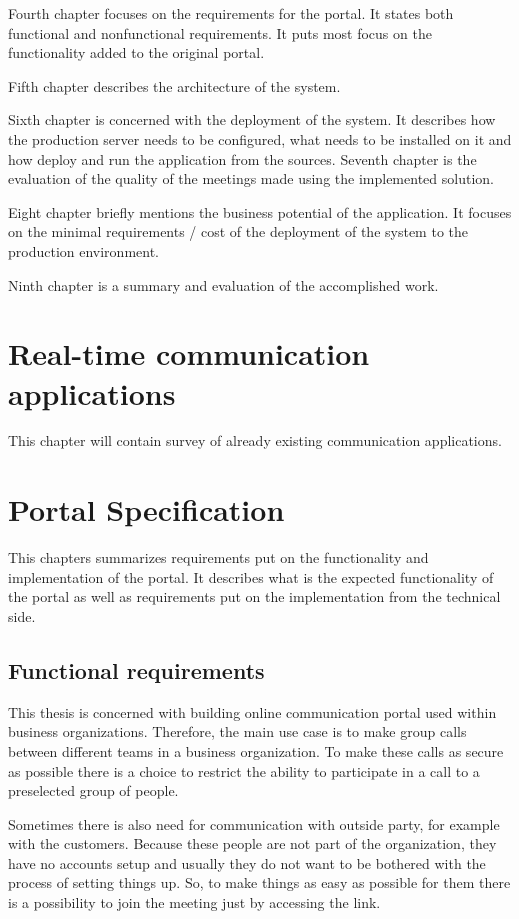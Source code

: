 \documentclass[
  digital, %
  table,   %
  lof,     %
  nolot,     %
]{fithesis3}
\begin{document}
Fourth chapter focuses on the requirements for the portal. It states both functional and nonfunctional requirements. It puts most focus on the functionality added to the original portal.

Fifth chapter describes the architecture of the system.

Sixth chapter is concerned with the deployment of the system. It describes how the production server needs to be configured, what needs to be installed on it and how deploy and run the application from the sources.
Seventh chapter is the evaluation of the quality of the meetings made using the implemented solution.

Eight chapter briefly mentions the business potential of the application. It focuses on the minimal requirements / cost of the deployment of the system to the production environment.

Ninth chapter is a summary and evaluation of the accomplished work.

\chapter{Real-time communication applications}
This chapter will contain survey of already existing communication applications.

\chapter{Portal Specification}
This chapters summarizes requirements put on the functionality and implementation of the portal. It describes what is the expected functionality of the portal as well as requirements put on the implementation from the technical side.

\section{Functional requirements}
This thesis is concerned with building online communication portal used within business organizations. Therefore, the main use case is to make group calls between different teams in a business organization. To make these calls as secure as possible there is a choice to restrict the ability to participate in a call to a preselected group of people.

Sometimes there is also need for communication with outside party, for example with the customers. Because these people are not part of the organization, they have no accounts setup and usually they do not want to be bothered with the process of setting things up. So, to make things as easy as possible for them there is a possibility to join the meeting just by accessing the link. 
\end{document}
